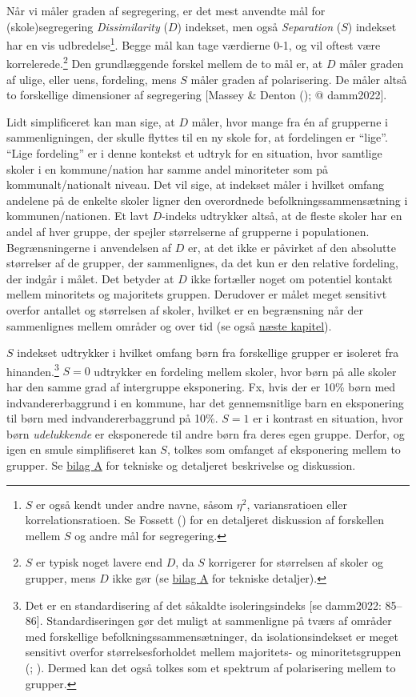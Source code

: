 \documentclass[
]{book}
\begin{document}
Når vi måler graden af segregering, er det mest anvendte mål for (skole)segregering \emph{Dissimilarity} (\(D\)) indekset, men også \emph{Separation} (\(S\)) indekset har en vis udbredelse\footnote{\(S\) er også kendt under andre navne, såsom \(\eta^2\), variansratioen eller korrelationsratioen. Se Fossett () for en detaljeret diskussion af forskellen mellem \(S\) og andre mål for segregering.}. Begge mål kan tage værdierne 0-1, og vil oftest være korrelerede.\footnote{\(S\) er typisk noget lavere end \(D\), da \(S\) korrigerer for størrelsen af skoler og grupper, mens \(D\) ikke gør (se \hyperref[bilag1]{bilag A} for tekniske detaljer).} Den grundlæggende forskel mellem de to mål er, at \(D\) måler graden af ulige, eller uens, fordeling, mens \(S\) måler graden af polarisering. De måler altså to forskellige dimensioner af segregering {[}Massey \& Denton (); @ damm2022{]}.

Lidt simplificeret kan man sige, at \(D\) måler, hvor mange fra én af grupperne i sammenligningen, der skulle flyttes til en ny skole for, at fordelingen er ``lige''. ``Lige fordeling'' er i denne kontekst et udtryk for en situation, hvor samtlige skoler i en kommune/nation har samme andel minoriteter som på kommunalt/nationalt niveau. Det vil sige, at indekset måler i hvilket omfang andelene på de enkelte skoler ligner den overordnede befolkningssammensætning i kommunen/nationen. Et lavt \(D\)-indeks udtrykker altså, at de fleste skoler har en andel af hver gruppe, der spejler størrelserne af grupperne i populationen. Begrænsningerne i anvendelsen af \(D\) er, at det ikke er påvirket af den absolutte størrelser af de grupper, der sammenlignes, da det kun er den relative fordeling, der indgår i målet. Det betyder at \(D\) ikke fortæller noget om potentiel kontakt mellem minoritets og majoritets gruppen. Derudover er målet meget sensitivt overfor antallet og størrelsen af skoler, hvilket er en begrænsning når der sammenlignes mellem områder og over tid (se også \hyperref[kap5]{næste kapitel}).

\(S\) indekset udtrykker i hvilket omfang børn fra forskellige grupper er isoleret fra hinanden.\footnote{Det er en standardisering af det såkaldte isoleringsindeks {[}se damm2022: 85--86{]}. Standardiseringen gør det muligt at sammenligne på tværs af områder med forskellige befolkningssammensætninger, da isolationsindekset er meget sensitivt overfor størrelsesforholdet mellem majoritets- og minoritetsgruppen (; ). Dermed kan det også tolkes som et spektrum af polarisering mellem to grupper.} \(S=0\) udtrykker en fordeling mellem skoler, hvor børn på alle skoler har den samme grad af intergruppe eksponering. Fx, hvis der er 10\% børn med indvandererbaggrund i en kommune, har det gennemsnitlige barn en eksponering til børn med indvandererbaggrund på 10\%. \(S=1\) er i kontrast en situation, hvor børn \emph{udelukkende} er eksponerede til andre børn fra deres egen gruppe. Derfor, og igen en smule simplifiseret kan \(S\), tolkes som omfanget af eksponering mellem to grupper. Se \hyperref[bilag1]{bilag A} for tekniske og detaljeret beskrivelse og diskussion.
\end{document}
